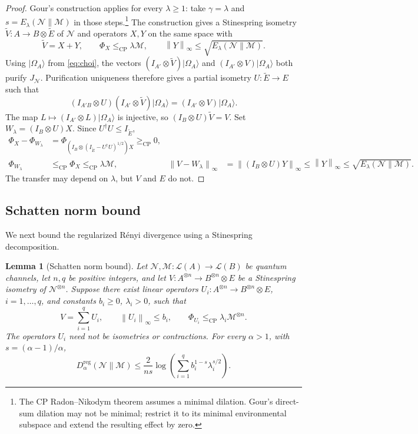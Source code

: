 \documentclass[11pt,letterpaper]{article}
\numberwithin{equation}{section}
\newtheorem{lemma}[theorem]{Lemma}
\newcommand{\N}{\mathcal N}
\newcommand{\M}{\mathcal M}
\newcommand{\reg}{\mathrm{reg}}
\newcommand{\cp}{\mathrm{CP}}
\newcommand{\Dt}{D}
\newcommand{\cL}{\mathcal L}
\newcommand{\norm}[1]{\left\lVert#1\right\rVert}
\begin{document}
\begin{proof}
Gour's construction \cite[proof of Theorem~2, Eqs.~(44)--(49)]{Gour} applies for every $\lambda\ge1$: take $\gamma=\lambda$ and $s=E_\lambda(\N\|\M)$ in those steps.\footnote{The CP Radon--Nikodym theorem assumes a minimal dilation. Gour's direct-sum dilation may not be minimal; restrict it to its minimal environmental subspace and extend the resulting effect by zero.} The construction gives a Stinespring isometry $\widetilde V:A\to B\otimes\widetilde E$ of $\N$ and operators $X,Y$ on the same space with
\[
 \widetilde V=X+Y,\qquad
 \Phi_X\le_{\cp}\lambda\M,\qquad
 \norm{Y}_\infty\le\sqrt{E_\lambda(\N\|\M)}.
\]
Using $|\Omega_A\rangle$ from \eqref{eq:choi}, the vectors $(I_{A'}\otimes\widetilde V)|\Omega_A\rangle$ and $(I_{A'}\otimes V)|\Omega_A\rangle$ both purify $J_\N$. Purification uniqueness therefore gives a partial isometry $U:\widetilde E\to E$ such that
\[
 (I_{A'B}\otimes U)(I_{A'}\otimes\widetilde V)|\Omega_A\rangle
 =(I_{A'}\otimes V)|\Omega_A\rangle.
\]
The map $L\mapsto(I_{A'}\otimes L)|\Omega_A\rangle$ is injective, so $(I_B\otimes U)\widetilde V=V$. Set $W_\lambda=(I_B\otimes U)X$. Since $U^\dagger U\le I_{\widetilde E}$,
\begin{align*}
 \Phi_X-\Phi_{W_\lambda}
 &=\Phi_{(I_B\otimes(I_{\widetilde E}-U^\dagger U)^{1/2})X}\ge_{\cp}0,\\
 \Phi_{W_\lambda}&\le_{\cp}\Phi_X\le_{\cp}\lambda\M,
 &\norm{V-W_\lambda}_\infty
 &=\norm{(I_B\otimes U)Y}_\infty
 \le\norm Y_\infty\le\sqrt{E_\lambda(\N\|\M)}.
\end{align*}
The transfer may depend on $\lambda$, but $V$ and $E$ do not.
\end{proof}

\subsection{Schatten norm bound}\label{sec:decomposition}
We next bound the regularized R\'enyi divergence using a Stinespring decomposition.

\begin{lemma}[Schatten norm bound]\label{lem:decomposition}
Let $\N,\M:\cL(A)\to\cL(B)$ be quantum channels, let $n,q$ be positive integers, and let $V:A^{\otimes n}\to B^{\otimes n}\otimes E$ be a Stinespring isometry of $\N^{\otimes n}$. Suppose there exist linear operators $U_i:A^{\otimes n}\to B^{\otimes n}\otimes E$, $i=1,\ldots,q$, and constants $b_i\ge0$, $\lambda_i>0$, such that
\[
 V=\sum_{i=1}^q U_i,\qquad
 \norm{U_i}_\infty\le b_i,\qquad
 \Phi_{U_i}\le_{\cp}\lambda_i\M^{\otimes n}.
\]
The operators $U_i$ need not be isometries or contractions. For every $\alpha>1$, with $s=(\alpha-1)/\alpha$,
\begin{equation}\label{eq:decomposition}
 \Dt_\alpha^{\reg}(\N\|\M)
 \le\frac{2}{ns}\log\left(\sum_{i=1}^q
               b_i^{1-s}\lambda_i^{s/2}\right).
\end{equation}
\end{lemma}
\end{document}
